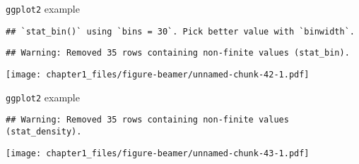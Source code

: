 \begin{frame}[fragile]{\texttt{ggplot2} example}
\protect\hypertarget{ggplot2-example}{}

\begin{Shaded}
\begin{Highlighting}[]
\StringTok{ }\NormalTok{(}
\OperatorTok{+}\StringTok{ }\NormalTok{(}\NormalTok{(}
\end{Highlighting}
\end{Shaded}

\begin{verbatim}
## `stat_bin()` using `bins = 30`. Pick better value with `binwidth`.
\end{verbatim}

\begin{verbatim}
## Warning: Removed 35 rows containing non-finite values (stat_bin).
\end{verbatim}

\texttt{[image: chapter1\_files/figure-beamer/unnamed-chunk-42-1.pdf]}

\end{frame}

\begin{frame}[fragile]{\texttt{ggplot2} example}
\protect\hypertarget{ggplot2-example-1}{}

\begin{Shaded}
\begin{Highlighting}[]
\OperatorTok{+}\StringTok{ }\NormalTok{(}\NormalTok{(}
\end{Highlighting}
\end{Shaded}

\begin{verbatim}
## Warning: Removed 35 rows containing non-finite values (stat_density).
\end{verbatim}

\texttt{[image: chapter1\_files/figure-beamer/unnamed-chunk-43-1.pdf]}

\end{frame}

